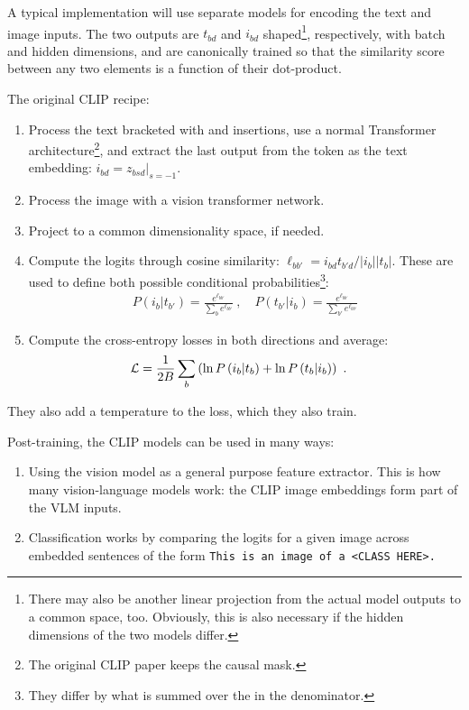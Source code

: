A typical implementation will use separate models for encoding the text and image inputs. The two
outputs are $ t _{ bd } $ and $ i _{ bd } $ shaped\footnote{There may also be another linear
projection from the actual model outputs to a common space, too. Obviously, this is also necessary
if the hidden dimensions of the two models differ.}, respectively, with batch and hidden dimensions,
and are canonically trained so that the similarity score between any two elements is a function of
their dot-product.

The original CLIP recipe:
\begin{enumerate}
    \item Process the text bracketed with \pyinline{[SOS]} and \pyinline{[EOS]} insertions, use a
        normal Transformer architecture\footnote{The original CLIP paper keeps the causal mask.},
        and extract the last output from the \pyinline{[EOS]} token as the text embedding: $ i _{ bd
        }= z _{ bsd }\big|_{ s=-1 } $.
    \item Process the image with a vision transformer network.
    \item Project to a common dimensionality space, if needed.
    \item Compute the logits through cosine similarity: $ \ell _{ b b' } = i _{ bd }t _{ b'd }/ |i _{ b }||t _{ b }| $. These are used to
        define both possible conditional probabilities\footnote{They differ by what is summed over the in the denominator.}:
        \begin{align}
         P(i_b|t _{ b' }) =  \frac{ e ^{ \ell _{b b'} } }{ \sum _{ b  } e ^{ \ell _{b b'} } }  \ ,
         \quad P(t _{ b' }| i _{ b }) =  \frac{ e ^{ \ell _{b b'} } }{ \sum _{ b' }  e ^{ \ell _{b b'} } }
        \end{align}
    \item Compute the cross-entropy losses in both directions and average:
        \begin{align}
           \mathcal{L}  &= \frac{ 1 }{ 2B }\sum _{ b } \left (\ln P \left ( i_b|t_b \right ) + \ln P \left ( t_b|i_b \right )\right ) \label{eq_clip_loss} \ .
        \end{align}
\end{enumerate}
They also add a temperature to the loss, which they also train.

Post-training, the CLIP models can be used in many ways:
\begin{enumerate}
    \item Using the vision model as a general purpose feature extractor. This is how many
        vision-language models work: the CLIP image embeddings form part of the VLM inputs.
    \item Classification works by comparing the logits for a given image across embedded sentences
        of the form \texttt{This is an image of a <CLASS HERE>.}
\end{enumerate}



